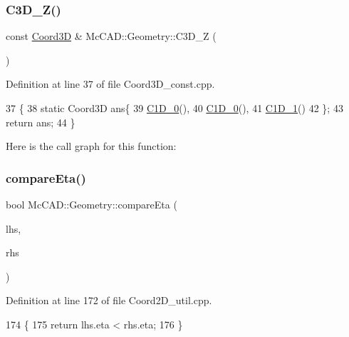\subsubsection{\texorpdfstring{C3\+D\+\_\+\+Z()}{C3D\_Z()}}
{\footnotesize\ttfamily const \hyperlink{classMcCAD_1_1Geometry_1_1Coord3D}{Coord3D} \& Mc\+C\+A\+D\+::\+Geometry\+::\+C3\+D\+\_\+Z (\begin{DoxyParamCaption}{ }\end{DoxyParamCaption})}



Definition at line 37 of file Coord3\+D\+\_\+const.\+cpp.


\begin{DoxyCode}
37                     \{
38     \textcolor{keyword}{static} Coord3D ans\{
39         \hyperlink{namespaceMcCAD_1_1Geometry_aef0aab16ba6382b032e4e3a8a5d37b94}{C1D\_0}(),
40         \hyperlink{namespaceMcCAD_1_1Geometry_aef0aab16ba6382b032e4e3a8a5d37b94}{C1D\_0}(),
41         \hyperlink{namespaceMcCAD_1_1Geometry_ad7994c2ae088570476d26d338aa22cff}{C1D\_1}()
42     \};
43     \textcolor{keywordflow}{return} ans;
44 \}
\end{DoxyCode}
Here is the call graph for this function\+:
\mbox{\label{namespaceMcCAD_1_1Geometry_ae8dcca15e60e44f6e98108cb0a724f30}} 
\subsubsection{\texorpdfstring{compare\+Eta()}{compareEta()}}
{\footnotesize\ttfamily bool Mc\+C\+A\+D\+::\+Geometry\+::compare\+Eta (\begin{DoxyParamCaption}\item[{const \hyperlink{classMcCAD_1_1Geometry_1_1Coord2D}{Coord2D} \&}]{lhs,  }\item[{const \hyperlink{classMcCAD_1_1Geometry_1_1Coord2D}{Coord2D} \&}]{rhs }\end{DoxyParamCaption})}



Definition at line 172 of file Coord2\+D\+\_\+util.\+cpp.


\begin{DoxyCode}
174                            \{
175     \textcolor{keywordflow}{return} lhs.eta < rhs.eta;
176 \}
\end{DoxyCode}
\mbox{\label{namespaceMcCAD_1_1Geometry_a96401f35436a80b526b6a785fda6742d}} 
